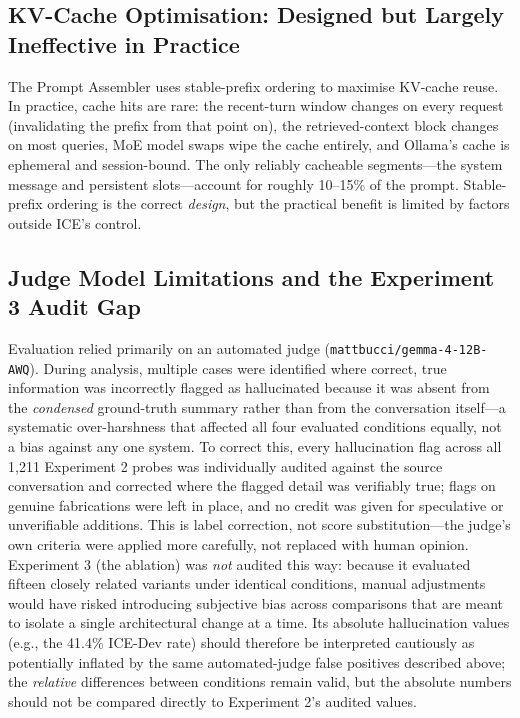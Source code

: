 \documentclass[11pt,a4paper]{article}
\begin{document}
\subsection{KV-Cache Optimisation: Designed but Largely Ineffective in Practice}
The Prompt Assembler uses stable-prefix ordering to maximise KV-cache reuse. In practice, cache hits are rare: the recent-turn window changes on every request (invalidating the prefix from that point on), the retrieved-context block changes on most queries, MoE model swaps wipe the cache entirely, and Ollama's cache is ephemeral and session-bound. The only reliably cacheable segments---the system message and persistent slots---account for roughly 10--15\% of the prompt. Stable-prefix ordering is the correct \emph{design}, but the practical benefit is limited by factors outside ICE's control.

\subsection{Judge Model Limitations and the Experiment 3 Audit Gap}
Evaluation relied primarily on an automated judge (\texttt{mattbucci/gemma-4-12B-AWQ}). During analysis, multiple cases were identified where correct, true information was incorrectly flagged as hallucinated because it was absent from the \emph{condensed} ground-truth summary rather than from the conversation itself---a systematic over-harshness that affected all four evaluated conditions equally, not a bias against any one system. To correct this, every hallucination flag across all 1{,}211 Experiment 2 probes was individually audited against the source conversation and corrected where the flagged detail was verifiably true; flags on genuine fabrications were left in place, and no credit was given for speculative or unverifiable additions. This is label correction, not score substitution---the judge's own criteria were applied more carefully, not replaced with human opinion. Experiment 3 (the ablation) was \emph{not} audited this way: because it evaluated fifteen closely related variants under identical conditions, manual adjustments would have risked introducing subjective bias across comparisons that are meant to isolate a single architectural change at a time. Its absolute hallucination values (e.g., the 41.4\% ICE-Dev rate) should therefore be interpreted cautiously as potentially inflated by the same automated-judge false positives described above; the \emph{relative} differences between conditions remain valid, but the absolute numbers should not be compared directly to Experiment 2's audited values.
\end{document}
